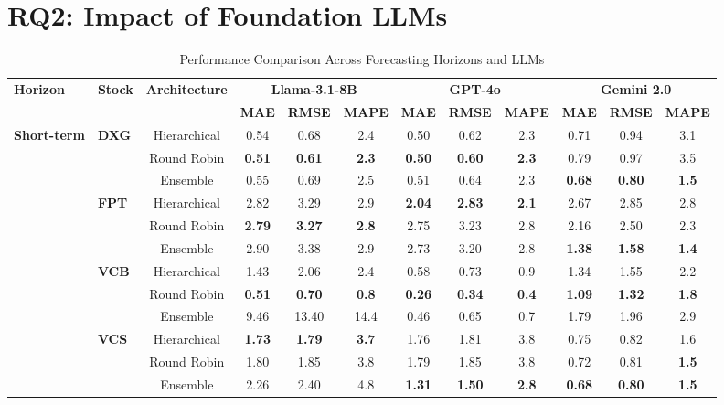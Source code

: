 \documentclass{ieeeaccess}
\begin{document}
\clearpage
\onecolumn
\section{RQ2: Impact of Foundation LLMs}
\begin{table}[!h]
\centering
\caption{Performance Comparison Across Forecasting Horizons and LLMs}
\label{tab:full_performance_all}
\setlength{\tabcolsep}{3pt}
\renewcommand{\arraystretch}{1.05}
\scriptsize
\begin{tabular}{llcccc|ccc|ccc}
\toprule
\multirow{2}{*}{\textbf{Horizon}} &
\multirow{2}{*}{\textbf{Stock}} &
\multirow{2}{*}{\textbf{Architecture}} &
\multicolumn{3}{c|}{\textbf{Llama-3.1-8B}} &
\multicolumn{3}{c|}{\textbf{GPT-4o}} &
\multicolumn{3}{c}{\textbf{Gemini 2.0}} \\
\cmidrule(lr){4-6} \cmidrule(lr){7-9} \cmidrule(lr){10-12}
& & & \textbf{MAE} & \textbf{RMSE} & \textbf{MAPE} & \textbf{MAE} & \textbf{RMSE} & \textbf{MAPE} & \textbf{MAE} & \textbf{RMSE} & \textbf{MAPE} \\
\midrule

\multirow{12}{*}{\textbf{Short-term}}
& \multirow{3}{*}{\textbf{DXG}} & Hierarchical & 0.54 & 0.68 & 2.4 & 0.50 & 0.62 & 2.3 & 0.71 & 0.94 & 3.1 \\
& & Round Robin & \textbf{0.51} & \textbf{0.61} & \textbf{2.3} & \textbf{0.50} & \textbf{0.60} & \textbf{2.3} & 0.79 & 0.97 & 3.5 \\
& & Ensemble & 0.55 & 0.69 & 2.5 & 0.51 & 0.64 & 2.3 & \textbf{0.68} & \textbf{0.80} & \textbf{1.5} \\
& \multirow{3}{*}{\textbf{FPT}} & Hierarchical & 2.82 & 3.29 & 2.9 & \textbf{2.04} & \textbf{2.83} & \textbf{2.1} & 2.67 & 2.85 & 2.8 \\
& & Round Robin & \textbf{2.79} & \textbf{3.27} & \textbf{2.8} & 2.75 & 3.23 & 2.8 & 2.16 & 2.50 & 2.3 \\
& & Ensemble & 2.90 & 3.38 & 2.9 & 2.73 & 3.20 & 2.8 & \textbf{1.38} & \textbf{1.58} & \textbf{1.4} \\
& \multirow{3}{*}{\textbf{VCB}} & Hierarchical & 1.43 & 2.06 & 2.4 & 0.58 & 0.73 & 0.9 & 1.34 & 1.55 & 2.2 \\
& & Round Robin & \textbf{0.51} & \textbf{0.70} & \textbf{0.8} & \textbf{0.26} & \textbf{0.34} & \textbf{0.4} & \textbf{1.09} & \textbf{1.32} & \textbf{1.8} \\
& & Ensemble & 9.46 & 13.40 & 14.4 & 0.46 & 0.65 & 0.7 & 1.79 & 1.96 & 2.9 \\
& \multirow{3}{*}{\textbf{VCS}} & Hierarchical & \textbf{1.73} & \textbf{1.79} & \textbf{3.7} & 1.76 & 1.81 & 3.8 & 0.75 & 0.82 & 1.6 \\
& & Round Robin & 1.80 & 1.85 & 3.8 & 1.79 & 1.85 & 3.8 & 0.72 & 0.81 & \textbf{1.5} \\
& & Ensemble & 2.26 & 2.40 & 4.8 & \textbf{1.31} & \textbf{1.50} & \textbf{2.8} & \textbf{0.68} & \textbf{0.80} & \textbf{1.5} \\
\midrule


\end{tabular}
\end{table}
\end{document}
